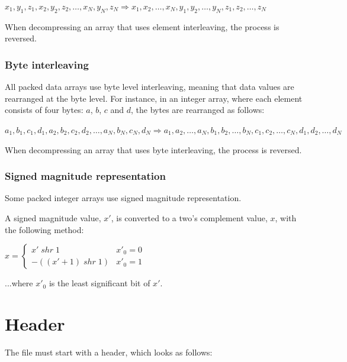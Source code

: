 \begin{center}
$x_1,y_1,z_1,x_2,y_2,z_2,\ldots,x_N,y_N,z_N \Rightarrow 
x_1,x_2,\ldots,x_N,y_1,y_2,\ldots,y_N,z_1,z_2,\ldots,z_N$
\end{center}

When decompressing an array that uses element interleaving, the process is
reversed.

\subsection{Byte interleaving}
All packed data arrays use byte level interleaving, meaning that data values
are rearranged at the byte level. For instance, in an integer array, where each
element consists of four bytes: $a$, $b$, $c$ and $d$, the bytes are rearranged
as follows:

\begin{center}
$a_1,b_1,c_1,d_1,a_2,b_2,c_2,d_2,\ldots,a_N,b_N,c_N,d_N \Rightarrow 
a_1,a_2,\ldots,a_N,b_1,b_2,\ldots,b_N,c_1,c_2,\ldots,c_N,d_1,d_2,\ldots,d_N$
\end{center}

When decompressing an array that uses byte interleaving, the process is
reversed.

\subsection{Signed magnitude representation}
Some packed integer arrays use signed magnitude representation.

A signed magnitude value, $x'$, is converted to a two's complement value,
$x$, with the following method:

$x = \left\{\begin{array}{ll}
x'\; shr\; 1 & x'_0 = 0 \\
-((x'+1)\; shr\; 1) & x'_0 = 1
\end{array} \right.$

...where $x'_0$ is the least significant bit of $x'$.



\chapter{Header}
The file must start with a header, which looks as follows:

